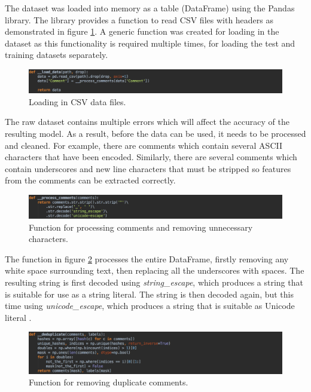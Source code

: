  The dataset was loaded into memory as a table (DataFrame) using the Pandas library. The library provides a function to read CSV files with headers as demonstrated in figure \ref{fig:AbuseDetection_LoadData}. A generic function was created for loading in the dataset as this functionality is required multiple times, for loading the test and training datasets separately.

\begin{figure}[H]
    \centering
    \includegraphics[width=\textwidth]{Images/Implementation/DataProcessing/AbuseDetection/LoadData}
    \caption{Loading in CSV data files.}
    \label{fig:AbuseDetection_LoadData}
\end{figure}

The raw dataset contains multiple errors which will affect the accuracy of the resulting model. As a result, before the data can be used, it needs to be processed and cleaned. For example, there are comments which contain several ASCII characters that have been encoded. Similarly, there are several comments which contain underscores and new line characters that must be stripped so features from the comments can be extracted correctly.

\begin{figure}[H]
    \centering
    \includegraphics[width=\textwidth]{Images/Implementation/DataProcessing/AbuseDetection/ProcessComments}
    \caption{Function for processing comments and removing unnecessary characters.}
    \label{fig:AbuseDetection-ProcessComments}
\end{figure}

The function in figure \ref{fig:AbuseDetection-ProcessComments} processes the entire DataFrame, firstly removing any white space surrounding text, then replacing all the underscores with spaces. The resulting string is first decoded using \emph{string\_escape}, which produces a string that is suitable for use as a string literal. The string is then decoded again, but this time using \emph{unicode\_escape}, which produces a string that is suitable as Unicode literal \cite{Python:Codes}.

\begin{figure}[H]
    \centering
    \includegraphics[width=\textwidth]{Images/Implementation/DataProcessing/AbuseDetection/Deduplicate}
    \caption{Function for removing duplicate comments.}
    \label{fig:AbuseDetection-Deduplicate}
\end{figure}


